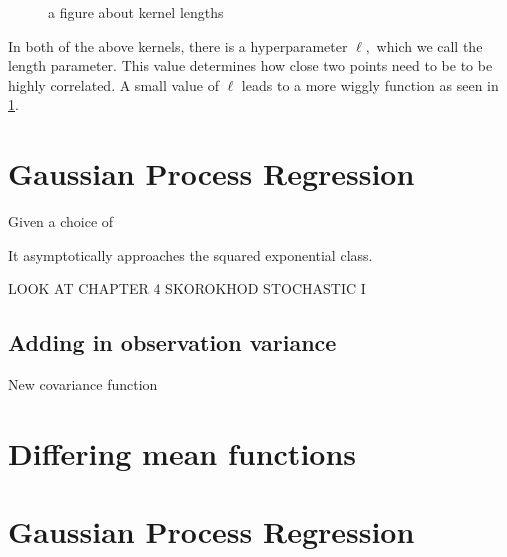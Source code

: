 \begin{figure}
    \caption{a figure about kernel lengths}
    \label{fig:no_reg_lengths}
\end{figure}

In both of the above kernels, there is a hyperparameter $\ell,$ which we call
the length parameter. This value determines how close two points need to be to
be highly correlated. A small value of $\ell$ leads to a more wiggly function
as seen in \ref{fig:no_reg_lengths}.

\section{Gaussian Process Regression}

Given a choice of


\begin{figure}
\end{figure}


\begin{figure}
\end{figure}

It asymptotically approaches the squared exponential class.

LOOK AT CHAPTER 4 SKOROKHOD STOCHASTIC I

\subsection*{Adding in observation variance}

\begin{figure}
\end{figure}

New covariance function

\section{Differing mean functions}



\begin{figure}
\end{figure}


\section{Gaussian Process Regression}

